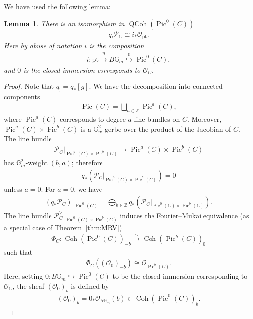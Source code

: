 \documentclass[11pt,oneside,a4paper,mathscr]{amsart}
\newtheorem{lemma}[thm]{Lemma}
\theoremstyle{definition}
\newcommand{\Pic}{\operatorname{Pic}}
\newcommand{\QCoh}{\operatorname{QCoh}}
\newcommand{\cP}{\mathcal{P}}
\newcommand{\bgm}{B\mathbb{G}_m}
\newcommand{\Coh}{\operatorname{Coh}}
\begin{document}
We have used the following lemma: 
\begin{lemma}\label{lem:Pc}
    There is an isomorphism in $\QCoh(\Pic^0(C))$
    \begin{align*}
        q_{!}\cP_C \cong i_{*}\mathcal{O}_{\mathrm{pt}}.
    \end{align*}
    Here by abuse of notation $i$ is the composition 
    \begin{align*}
i \colon \mathrm{pt}
\stackrel{\eta}{\to}
\bgm
\stackrel{0}{\hookrightarrow}
\Pic^0(C),
\end{align*}
and $0$ is the closed immersion corresponds to $\mathcal{O}_C$. 
\end{lemma}
\begin{proof}
    Note that $q_{!}=q_{*}[g]$.
We have the decomposition into connected components
\begin{align*}
\Pic(C)=\bigsqcup_{a\in \mathbb{Z}}\Pic^a(C),
\end{align*}
where $\Pic^a(C)$ corresponds to degree $a$ line bundles on $C$.
Moreover, $\Pic^a(C)\times \Pic^b(C)$ is a $\mathbb{G}_m^2$-gerbe over the product of the Jacobian of $C$. The line bundle
\begin{align*}
\cP_C|_{\Pic^a(C)\times \Pic^b(C)}
\to
\Pic^a(C) \times \Pic^b(C)
\end{align*}
has $\mathbb{G}_m^2$-weight $(b,a)$; therefore
\begin{align*}
q_{*}\left(\cP_C|_{\Pic^a(C)\times \Pic^b(C)}\right)=0
\end{align*}
unless $a=0$. For $a=0$, we have
\begin{align*}
(q_{*}\cP_C)|_{\Pic^0(C)}
=
\bigoplus_{b\in \mathbb{Z}}
q_{*}\left(\cP_C|_{\Pic^0(C)\times \Pic^b(C)}\right).
\end{align*}
The line bundle $\cP_C^{\vee}|_{\Pic^0(C)\times \Pic^b(C)}$ induces the Fourier--Mukai equivalence (as a special case of Theorem~\ref{thm:MRV})
\begin{align*}
\Phi_C \colon 
\Coh(\Pic^0(C))_{-b}
\stackrel{\sim}{\to}
\Coh(\Pic^b(C))_0
\end{align*}
such that
\begin{align*}
\Phi_C((\mathcal{O}_0)_{-b})
\cong
\mathcal{O}_{\Pic^b(C)}.
\end{align*}
Here, setting 
$
0 \colon \bgm \hookrightarrow \Pic^0(C)
$
to be the closed immersion corresponding to $\mathcal{O}_C$, the sheaf $(\mathcal{O}_0)_b$ is defined by
\begin{align*}
(\mathcal{O}_0)_b
=
0_{*}\mathcal{O}_{\bgm}(b)
\in
\Coh(\Pic^0(C))_b.

\end{align*}
\end{proof}
\end{document}
